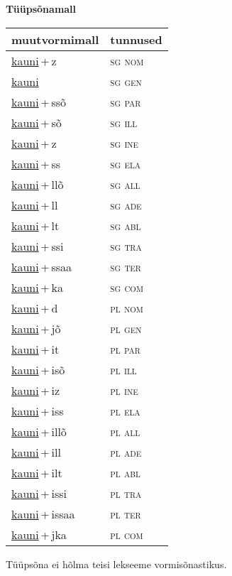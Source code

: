
\vspace{1.8em}
\begin{minipage}{\textwidth}
\textbf{Tüüpsõnamall \,}\\

\begin{sideways}
\begin{tabular}{l l}
muutvormimall & tunnused \\
\hline
\underline{kauni}\,+\,z & \textsc{ sg nom } \\
\underline{kauni} & \textsc{ sg gen } \\
\underline{kauni}\,+\,ssõ & \textsc{ sg par } \\
\underline{kauni}\,+\,sõ & \textsc{ sg ill } \\
\underline{kauni}\,+\,z & \textsc{ sg ine } \\
\underline{kauni}\,+\,ss & \textsc{ sg ela } \\
\underline{kauni}\,+\,llõ & \textsc{ sg all } \\
\underline{kauni}\,+\,ll & \textsc{ sg ade } \\
\underline{kauni}\,+\,lt & \textsc{ sg abl } \\
\underline{kauni}\,+\,ssi & \textsc{ sg tra } \\
\underline{kauni}\,+\,ssaa & \textsc{ sg ter } \\
\underline{kauni}\,+\,ka & \textsc{ sg com } \\
\underline{kauni}\,+\,d & \textsc{ pl nom } \\
\underline{kauni}\,+\,jõ & \textsc{ pl gen } \\
\underline{kauni}\,+\,it & \textsc{ pl par } \\
\underline{kauni}\,+\,isõ & \textsc{ pl ill } \\
\underline{kauni}\,+\,iz & \textsc{ pl ine } \\
\underline{kauni}\,+\,iss & \textsc{ pl ela } \\
\underline{kauni}\,+\,illõ & \textsc{ pl all } \\
\underline{kauni}\,+\,ill & \textsc{ pl ade } \\
\underline{kauni}\,+\,ilt & \textsc{ pl abl } \\
\underline{kauni}\,+\,issi & \textsc{ pl tra } \\
\underline{kauni}\,+\,issaa & \textsc{ pl ter } \\
\underline{kauni}\,+\,jka & \textsc{ pl com } \\
\end{tabular}
\end{sideways}
\label{tab:tüüpsõnamall-kauniz}

\end{minipage}

 
\vspace{1em}
\noindent Tüüpsõna ei hõlma teisi lekseeme vormi\-sõnastikus.
